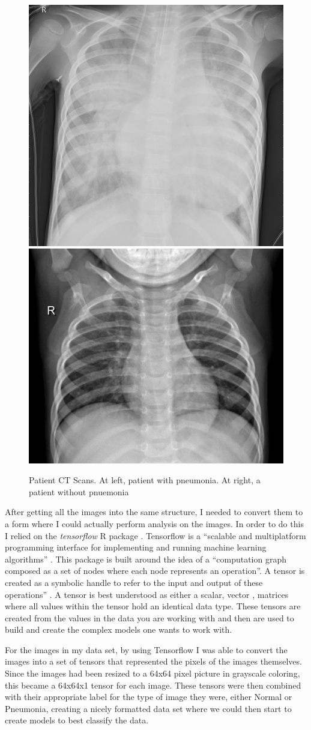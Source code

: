 \documentclass[12pt]{article}
\begin{document}
\begin{figure}
\includegraphics[width=0.49\linewidth,height=0.25\textheight]{images/pneumonia} \includegraphics[width=0.49\linewidth,height=0.25\textheight]{images/normal} \caption{Patient CT Scans. At left, patient with pneumonia. At right, a patient without pnuemonia}\label{fig:sample-fig2}
\end{figure}

After getting all the images into the same structure, I needed to
convert them to a form where I could actually perform analysis on the
images. In order to do this I relied on the \emph{tensorflow} R package
\citep{Tensorflow2}. Tensorflow is a ``scalable and multiplatform
programming interface for implementing and running machine learning
algorithms'' \citep{PML}. This package is built around the idea of a
``computation graph composed as a set of nodes where each node
represents an operation''. A tensor is created as a symbolic handle to
refer to the input and output of these operations'' \citep{PML}. A
tensor is best understood as either a scalar, vector , matrices where
all values within the tensor hold an identical data type. These tensors
are created from the values in the data you are working with and then
are used to build and create the complex models one wants to work with.

For the images in my data set, by using Tensorflow I was able to convert
the images into a set of tensors that represented the pixels of the
images themselves. Since the images had been resized to a 64x64 pixel
picture in grayscale coloring, this became a 64x64x1 tensor for each
image. These tensors were then combined with their appropriate label for
the type of image they were, either Normal or Pneumonia, creating a
nicely formatted data set where we could then start to create models to
best classify the data.
\end{document}
